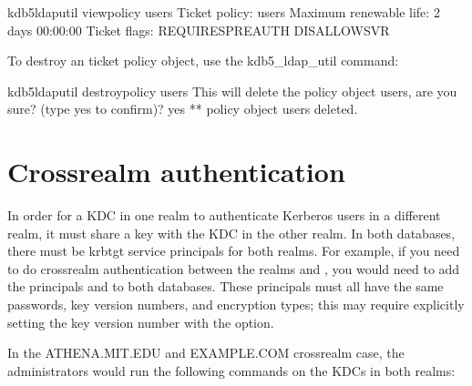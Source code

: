 \documentclass[letterpaper,10pt,english]{sphinxmanual}
\begin{document}
\begin{sphinxVerbatim}[commandchars=\\\{\}]
\PYGZdl{} kdb5\PYGZus{}ldap\PYGZus{}util view\PYGZus{}policy users
            Ticket policy: users
   Maximum renewable life: 2 days 00:00:00
             Ticket flags: REQUIRES\PYGZus{}PRE\PYGZus{}AUTH DISALLOW\PYGZus{}SVR
\end{sphinxVerbatim}

\sphinxAtStartPar
To destroy an ticket policy object, use the kdb5\_ldap\_util
 command:

\begin{sphinxVerbatim}[commandchars=\\\{\}]
\PYGZdl{} kdb5\PYGZus{}ldap\PYGZus{}util destroy\PYGZus{}policy users
This will delete the policy object \PYGZsq{}users\PYGZsq{}, are you sure?
(type \PYGZsq{}yes\PYGZsq{} to confirm)? yes
** policy object \PYGZsq{}users\PYGZsq{} deleted.
\end{sphinxVerbatim}


\section{Cross\sphinxhyphen{}realm authentication}
\label{\detokenize{admin/database:cross-realm-authentication}}\label{\detokenize{admin/database:xrealm-authn}}
\sphinxAtStartPar
In order for a KDC in one realm to authenticate Kerberos users in a
different realm, it must share a key with the KDC in the other realm.
In both databases, there must be krbtgt service principals for both realms.
For example, if you need to do cross\sphinxhyphen{}realm authentication between the realms
 and , you would need to add the
principals  and
 to both databases.
These principals must all have the same passwords, key version
numbers, and encryption types; this may require explicitly setting
the key version number with the  option.

\sphinxAtStartPar
In the ATHENA.MIT.EDU and EXAMPLE.COM cross\sphinxhyphen{}realm case, the administrators
would run the following commands on the KDCs in both realms:
\end{document}
